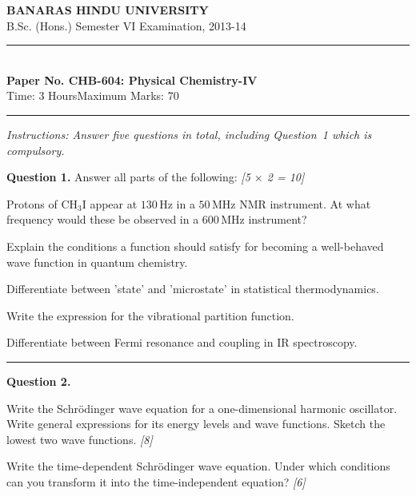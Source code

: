 \documentclass[11pt,a4paper]{article}
\newcommand{\pts}[1]{\hfill   \textit{[#1]}}
\begin{document}
\begin{center}
  {\large\bfseries BANARAS HINDU UNIVERSITY}\\[2pt]
  {
\normalsize B.Sc. (Hons.) Semester VI Examination, 2013-14}\\[6pt]
  \rule{0.8\linewidth}{0.5pt}\\[6pt]
  {\large\bfseries Paper No. CHB-604: Physical Chemistry-IV}\\[4pt]
  {
\normalsize Time: 3 Hours\hfill Maximum Marks: 70}
\end{center}
\rule{\linewidth}{0.4pt}
\small



\noindent   \textit{Instructions: Answer five questions in total, including Question~1 which is compulsory.}

\normalsize
\bigskip




\noindent   \textbf{Question 1.} Answer all parts of the following: \pts{5 $ \times$ 2 = 10}

\begin{parts}
  \item Protons of $ \text{CH}_3 \text{I}$ appear at $130\, \text{Hz}$ in a $50\, \text{MHz}$ NMR instrument. At what frequency would these be observed in a $600\, \text{MHz}$ instrument?
  \item Explain the conditions a function should satisfy for becoming a well-behaved wave function in quantum chemistry.
  \item Differentiate between 'state' and 'microstate' in statistical thermodynamics.
  \item Write the expression for the vibrational partition function.
  \item Differentiate between Fermi resonance and coupling in IR spectroscopy.
\end{parts}

\medskip\rule{\linewidth}{0.2pt}




\noindent   \textbf{Question 2.}

\begin{parts}
  \item Write the Schr\"odinger wave equation for a one-dimensional harmonic oscillator. Write general expressions for its energy levels and wave functions. Sketch the lowest two wave functions. \pts{8}
  \item Write the time-dependent Schr\"odinger wave equation. Under which conditions can you transform it into the time-independent equation? \pts{6}
\end{parts}
\end{document}
